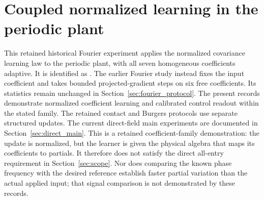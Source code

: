 \section{Coupled normalized learning in the periodic plant}
\label{sec:normalized_fourier_results}

This retained historical Fourier experiment applies the normalized covariance
learning law to
the periodic plant, with all seven homogeneous coefficients adaptive.
It is identified as .
The earlier Fourier study instead fixes the input coefficient and takes
bounded projected-gradient steps on six free coefficients. Its statistics
remain unchanged in Section~\ref{sec:fourier_protocol}. The present records
demonstrate normalized coefficient learning and calibrated control readout
within the stated family. The retained contact and Burgers protocols use
separate structured updates. The current direct-field main experiments are
documented in Section~\ref{sec:direct_main}. This is a retained
coefficient-family demonstration: the update is normalized, but the learner
is given the physical algebra that maps its coefficients to partials.
It therefore does not satisfy the direct all-entry requirement in
Section~\ref{sec:scope}. Nor does comparing the known phase frequency with
the desired reference establish faster partial variation than the actual
applied input; that signal comparison is not demonstrated by these records.

